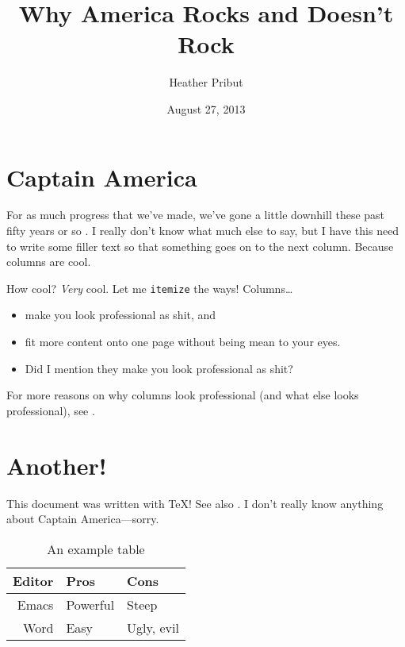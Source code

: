 \documentclass{biopaper}
\title{Why America Rocks and Doesn't Rock}
\author{Heather Pribut}
\date{August 27, 2013}
\begin{document}
\maketitle

\section{Captain America}
For as much progress that we've made,
  we've gone a little downhill
  these past fifty years or so \autocite{rogers:elements}.
I really don't know what much else to say,
  but I have this need to write some filler text
  so that something goes on to the next column.
Because columns are cool.

How cool?
\emph{Very} cool.
Let me \texttt{itemize} the ways!
Columns\dots
\begin{itemize}
\item make you look professional as shit, and
\item fit more content onto one page without being mean to your eyes.
\item Did I mention they make you look professional as shit?
\end{itemize}

For more reasons on why columns look professional
  (and what else looks professional),
  see \cite{compandtype}.

\section{Another!}
This document was written with \TeX! See also \cite{texbook}.
I don't really know anything about Captain America---sorry.

\begin{table}
  \centering
  \begin{tabular}{rll}
    \toprule
    Editor & Pros & Cons \\
    \midrule
    Emacs & Powerful & Steep \\
    Word  & Easy & Ugly, evil \\
    \bottomrule
  \end{tabular}
  \caption{An example table}
  \label{tab:ex}
\end{table}

\printbibliography
\end{document}
